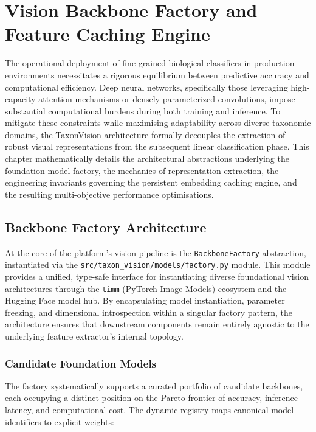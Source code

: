 \chapter{Vision Backbone Factory and Feature Caching Engine}
\label{ch:vision_backbone_factory}

The operational deployment of fine-grained biological classifiers in production environments necessitates a rigorous equilibrium between predictive accuracy and computational efficiency. Deep neural networks, specifically those leveraging high-capacity attention mechanisms or densely parameterized convolutions, impose substantial computational burdens during both training and inference. To mitigate these constraints while maximising adaptability across diverse taxonomic domains, the TaxonVision architecture formally decouples the extraction of robust visual representations from the subsequent linear classification phase. This chapter mathematically details the architectural abstractions underlying the foundation model factory, the mechanics of representation extraction, the engineering invariants governing the persistent embedding caching engine, and the resulting multi-objective performance optimisations.

\section{Backbone Factory Architecture}
\label{sec:backbone_factory_architecture}

At the core of the platform's vision pipeline is the \texttt{BackboneFactory} abstraction, instantiated via the \texttt{src/taxon\_vision/models/factory.py} module. This module provides a unified, type-safe interface for instantiating diverse foundational vision architectures through the \texttt{timm} (PyTorch Image Models) ecosystem and the Hugging Face model hub. By encapsulating model instantiation, parameter freezing, and dimensional introspection within a singular factory pattern, the architecture ensures that downstream components remain entirely agnostic to the underlying feature extractor's internal topology.

\subsection{Candidate Foundation Models}

The factory systematically supports a curated portfolio of candidate backbones, each occupying a distinct position on the Pareto frontier of accuracy, inference latency, and computational cost. The dynamic registry maps canonical model identifiers to explicit weights:

